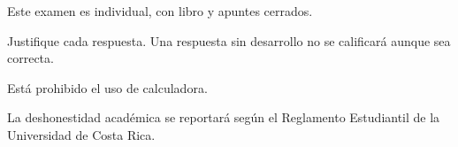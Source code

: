 \documentclass{emate-ucr}
\begin{document}
\imprimirtitulo

\datosestudiante

\begin{instrucciones}
  \item Este examen es individual, con libro y apuntes cerrados.
  \item Justifique cada respuesta. Una respuesta sin desarrollo no se
        calificará aunque sea correcta.
  \item Está prohibido el uso de calculadora.
  \item La deshonestidad académica se reportará según el Reglamento
        Estudiantil de la Universidad de Costa Rica.
\end{instrucciones}
\end{document}
